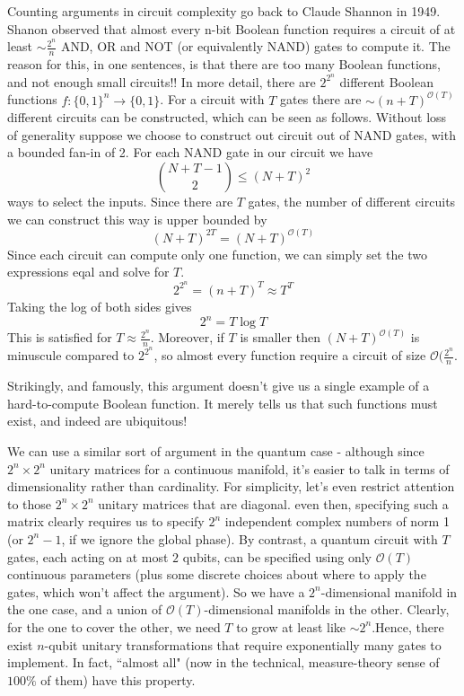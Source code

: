 Counting arguments in circuit complexity go back to Claude Shannon in 1949. Shanon observed that almost every n-bit Boolean function requires a circuit of at least $\sim \frac{2^n}{n}$ AND, OR and NOT (or equivalently NAND) gates to compute it. The reason for this, in one sentences, is that there are too many Boolean functions, and not enough small circuits!! In more detail, there are $2^{2^n}$ different Boolean functions $f:\{0,1\}^n\rightarrow \{0,1\}$. For a circuit with $T$ gates there are $\sim (n+T)^{\mathcal{O}(T)}$ different circuits can be constructed, which can be seen as follows. Without loss of generality suppose we choose to construct out circuit out of NAND gates, with a bounded fan-in of 2. For each NAND gate in our circuit we have
\[
\binom{N+T-1}{2}\leq (N+T)^2
\]
ways to select the inputs. Since there are $T$ gates, the number of different circuits we can construct this way is upper bounded by
\[
(N+T)^{2T}=(N+T)^{\mathcal{O}(T)}
\]
Since each circuit can compute only one function, we can simply set the two expressions eqal and solve for $T$.
\[
2^{2^n} =(n+T)^{T}\approx T^T
\]
Taking the log of both sides gives
\[
2^n = T\log T
\]
This is satisfied for $T\approx \frac{2^n}{n}$. Moreover, if $T$ is smaller then $(N+T)^{\mathcal{O}(T)}$ is minuscule compared to $2^{2^n}$, so almost every function require a circuit of size $\mathcal{O}(\frac{2^n}{n}$.

Strikingly, and famously, this argument doesn't give us a single example of a hard-to-compute Boolean function. It merely tells us that such functions must exist, and indeed are ubiquitous!

We can use a similar sort of argument in the quantum case - although since $2^n\times 2^n$ unitary matrices for a continuous manifold, it's easier to talk in terms of dimensionality rather than cardinality. For simplicity, let's even restrict attention to those $2^n\times 2^n$ unitary matrices that are diagonal. even then, specifying such a matrix clearly requires us to specify $2^n$ independent complex numbers of norm 1 (or $2^n-1$, if we ignore the global phase). By contrast, a quantum circuit with $T$ gates, each acting on at most $2$ qubits, can be specified using only $\mathcal{O}(T)$ continuous parameters (plus some discrete choices about where to apply the gates, which won't affect the argument). So we have a $2^n$-dimensional manifold in the one case, and a union of $\mathcal{O}(T)$-dimensional manifolds in the other. Clearly, for the one to cover the other, we need $T$ to grow at least like $\sim2^n$.Hence, there exist $n$-qubit unitary transformations that require exponentially many gates to implement. In fact, ``almost all" (now in the technical, measure-theory sense of $100\%$ of them) have this property.

